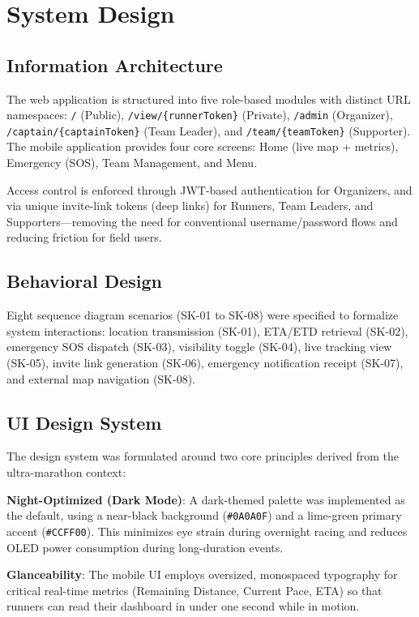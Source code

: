 \documentclass[conference]{IEEEtran}
\begin{document}
\section{System Design}

\subsection{Information Architecture}
The web application is structured into five role-based modules with distinct URL namespaces: \texttt{/} (Public), \texttt{/view/\{runnerToken\}} (Private), \texttt{/admin} (Organizer), \texttt{/captain/\{captainToken\}} (Team Leader), and \texttt{/team/\{teamToken\}} (Supporter). The mobile application provides four core screens: Home (live map + metrics), Emergency (SOS), Team Management, and Menu.

Access control is enforced through JWT-based authentication for Organizers, and via unique invite-link tokens (deep links) for Runners, Team Leaders, and Supporters---removing the need for conventional username/password flows and reducing friction for field users.

\subsection{Behavioral Design}
Eight sequence diagram scenarios (SK-01 to SK-08) were specified to formalize system interactions: location transmission (SK-01), ETA/ETD retrieval (SK-02), emergency SOS dispatch (SK-03), visibility toggle (SK-04), live tracking view (SK-05), invite link generation (SK-06), emergency notification receipt (SK-07), and external map navigation (SK-08).

\subsection{UI Design System}
The design system was formulated around two core principles derived from the ultra-marathon context:

\textbf{Night-Optimized (Dark Mode)}: A dark-themed palette was implemented as the default, using a near-black background (\texttt{\#0A0A0F}) and a lime-green primary accent (\texttt{\#CCFF00}). This minimizes eye strain during overnight racing and reduces OLED power consumption during long-duration events.

\textbf{Glanceability}: The mobile UI employs oversized, monospaced typography for critical real-time metrics (Remaining Distance, Current Pace, ETA) so that runners can read their dashboard in under one second while in motion.
\end{document}
